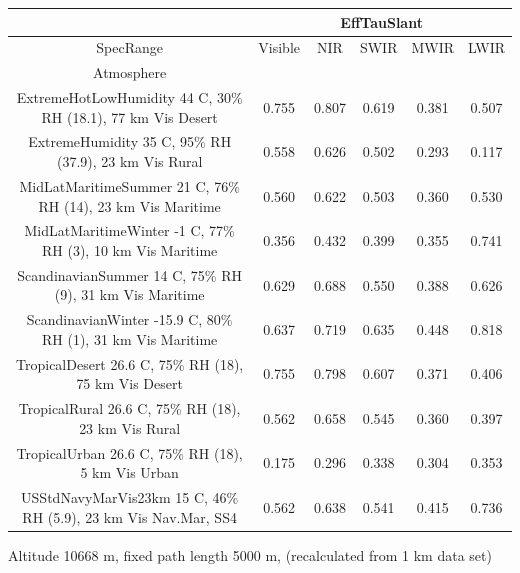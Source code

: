 \documentclass{workpackage}
\begin{document}
\begin{center}

\begin{footnotesize}

\begin{tabular}{|c|c|c|c|c|c|}
\hline
&\multicolumn{5}{|c|}{EffTauSlant}\\\hline
SpecRange&Visible&NIR&SWIR&MWIR&LWIR\\\hline
Atmosphere&&&&&\\\hline
ExtremeHotLowHumidity 44 C, 30\% RH (18.1), 77 km Vis Desert&0.755&0.807&0.619&0.381&0.507\\\hline
ExtremeHumidity 35 C, 95\% RH (37.9), 23 km Vis Rural&0.558&0.626&0.502&0.293&0.117\\\hline
MidLatMaritimeSummer 21 C, 76\% RH (14), 23 km Vis Maritime&0.560&0.622&0.503&0.360&0.530\\\hline
MidLatMaritimeWinter -1 C, 77\% RH (3), 10 km Vis Maritime&0.356&0.432&0.399&0.355&0.741\\\hline
ScandinavianSummer 14 C, 75\% RH (9), 31 km Vis Maritime&0.629&0.688&0.550&0.388&0.626\\\hline
ScandinavianWinter -15.9 C, 80\% RH (1), 31 km Vis Maritime&0.637&0.719&0.635&0.448&0.818\\\hline
TropicalDesert 26.6 C, 75\% RH (18), 75 km Vis Desert&0.755&0.798&0.607&0.371&0.406\\\hline
TropicalRural 26.6 C, 75\% RH (18), 23 km Vis Rural&0.562&0.658&0.545&0.360&0.397\\\hline
TropicalUrban 26.6 C, 75\% RH (18), 5 km Vis Urban&0.175&0.296&0.338&0.304&0.353\\\hline
USStdNavyMarVis23km 15 C, 46\% RH (5.9), 23 km Vis Nav.Mar, SS4&0.562&0.638&0.541&0.415&0.736\\\hline

\end{tabular}
\end{footnotesize}
\end{center}

Altitude 10668 m, fixed path length 5000 m, (recalculated from 1 km data set)
\end{document}
